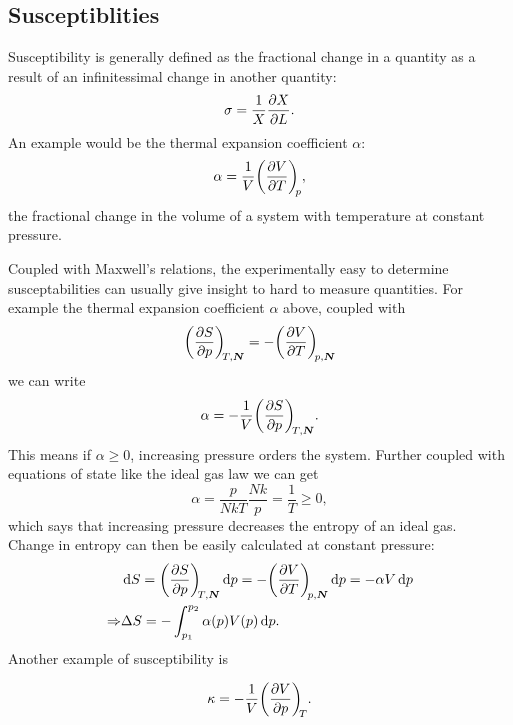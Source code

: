 \subsection{Susceptiblities}
\begin{defi}[Susceptibility]
Susceptibility is generally defined as the fractional change in a quantity as a result of an infinitessimal change in another quantity:
\begin{equation}
\sigma=\frac{1}{X}\diffp XL.
\end{equation}
An example would be the thermal expansion coefficient $\alpha$:
\begin{equation}
\alpha=\frac{1}{V}\diffp VT[p],
\end{equation}
the fractional change in the volume of a system with temperature at constant pressure. 
\end{defi}
Coupled with Maxwell's relations, the experimentally easy to determine susceptabilities can usually give insight to hard to measure quantities. For example the thermal expansion coefficient $\alpha$ above, coupled with
\begin{equation}
\diffp Sp[T,\bvec{N}]=-\diffp VT[p,\bvec{N}]
\end{equation}
we can write
\begin{equation}
\alpha=-\frac{1}{V}\diffp Sp[T,\bvec{N}].
\end{equation}
This means if $\alpha\geq0$, increasing pressure orders the system. Further coupled with equations of state like the ideal gas law we can get
\begin{equation}
\alpha=\frac{p}{NkT}\frac{Nk}{p}=\frac{1}{T}\geq0,
\end{equation}
which says that increasing pressure decreases the entropy of an ideal gas. \\
Change in entropy can then be easily calculated at constant pressure:
\begin{subequations}
\begin{align}
&\dif S=\diffp Sp[T,\bvec{N}]\dif p=-\diffp VT[p,\bvec{N}]\dif p=-\alpha V\dif p\\
\imp&\Delta S=-\int^{p_2}_{p_1}\alpha(p)V(p)\dif p.
\end{align}
\end{subequations}
Another example of susceptibility is 
\begin{defi}
\begin{equation}
\kappa=-\frac{1}{V}\diffp Vp[T].
\end{equation}
\end{defi}
